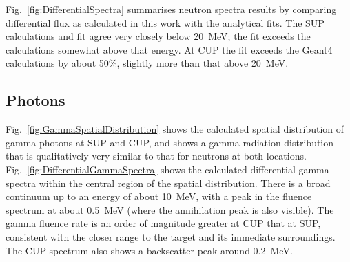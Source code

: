 \documentclass[peerreviewca,11pt,a4paper]{IEEEtran}
\begin{document}
Fig.~\ref{fig:DifferentialSpectra} summarises neutron spectra results by comparing differential flux as calculated in this work with the analytical fits.
The SUP calculations and fit agree very closely below \SI{20}{\MeV}; the fit exceeds the calculations somewhat above that energy.
At CUP the fit exceeds the Geant4 calculations by about 50\%, slightly more than that above \SI{20}{\MeV}.

\subsection{Photons}
Fig.~\ref{fig:GammaSpatialDistribution} shows the calculated spatial distribution of gamma photons at SUP and CUP, and shows a gamma radiation distribution that is qualitatively very similar to that for neutrons at both locations.
Fig.~\ref{fig:DifferentialGammaSpectra} shows the calculated differential gamma spectra within the central region of the spatial distribution.
There is a broad continuum up to an energy of about \SI{10}{\MeV}, with a peak in the fluence spectrum at about \SI{0.5}{\MeV} (where the annihilation peak is also visible).
The gamma fluence rate is an order of magnitude greater at CUP that at SUP, consistent with the closer range to the target and its immediate surroundings.
The CUP spectrum also shows a backscatter peak around \SI{0.2}{\MeV}.
\end{document}
